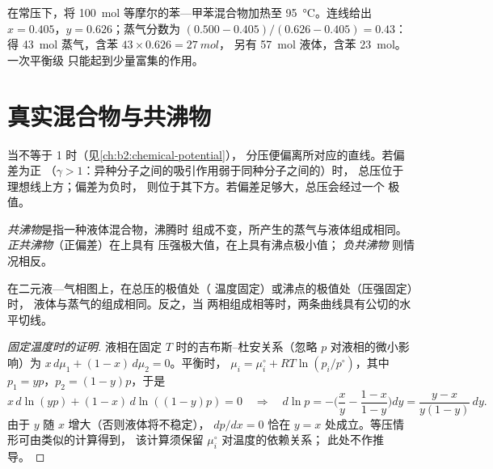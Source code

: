 \begin{example}\label{ex:b2:liquid-vapour-diagrams:flash}
在常压下，将 \qty{100}{mol} 等摩尔的苯—甲苯混合物加热至
\qty{95}{\degreeCelsius}。连线给出 $x =
0.405$，$y = 0.626$；蒸气分数为 $(0.500 - 0.405)/(0.626 - 0.405) =
0.43$：得 \qty{43}{mol} 蒸气，含苯 $43 \times 0.626 = \qty{27}{mol}$，
另有 \qty{57}{mol} 液体，含苯 \qty{23}{mol}。一次平衡级
只能起到少量富集的作用。
\end{example}

\section{真实混合物与共沸物}

当不等于 1 时（见\cref{ch:b2:chemical-potential}），
分压便偏离所对应的直线。若偏差为正
（$\gamma > 1$：异种分子之间的吸引作用弱于同种分子之间的）时，
总压位于理想线上方；偏差为负时，
则位于其下方。若偏差足够大，总压会经过一个
极值。

\begin{definition}[共沸物]\label{def:b2:liquid-vapour-diagrams:azeotrope}
\emph{共沸物}是指一种液体混合物，沸腾时
组成不变，所产生的蒸气与液体组成相同。
\emph{正共沸物}（正偏差）在上具有
压强极大值，在上具有沸点极小值；
\emph{负共沸物}
则情况相反。
\end{definition}

\begin{theorem}\label{thm:b2:liquid-vapour-diagrams:konovalov}
在二元液—气相图上，在总压的极值处（
温度固定）或沸点的极值处（压强固定）时，
液体与蒸气的组成相同。反之，当
两相组成相等时，两条曲线具有公切的水平切线。
\end{theorem}

\begin{proof}[固定温度时的证明]
液相在固定 $T$ 时的吉布斯–杜安关系（忽略 $p$
对液相的微小影响）为 $x\,d\mu_1 + (1 - x)\,d\mu_2 = 0$。平衡时，
$\mu_i = \mu_i^\circ + RT\ln(p_i/p^\circ)$，其中 $p_1 = yp$，$p_2 = (1 - y)p$，于是
\[
  x\,d\ln(yp) + (1 - x)\,d\ln((1 - y)p) = 0
  \quad\Longrightarrow\quad
  d\ln p = -\Big(\frac{x}{y} - \frac{1 - x}{1 - y}\Big)dy
  = \frac{y - x}{y(1 - y)}\,dy .
\]
由于 $y$ 随 $x$ 增大（否则液体将不稳定），
$dp/dx = 0$ 恰在 $y = x$ 处成立。等压情形可由类似的计算得到，
该计算须保留 $\mu_i^\circ$ 对温度的依赖关系；
此处不作推导。
\end{proof}

